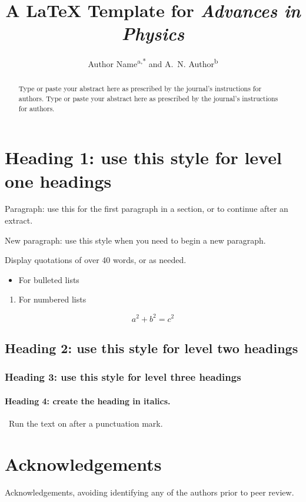 \documentclass{tandf}
\title{A \LaTeX{} Template for \textit{Advances in Physics}}
\author{Author Name\textsuperscript{a,*} and A.~N. Author\textsuperscript{b}}
\affiliation{\textsuperscript{a}Department, University, City, Country; \textsuperscript{b}Department, University, City, Country}
\begin{document}
\maketitle
\begin{abstract}
Type or paste your abstract here as prescribed by the journal's instructions for authors. Type or paste your abstract here as prescribed by the journal's instructions for authors.
\end{abstract}
\section{Heading 1: use this style for level one headings}
Paragraph: use this for the first paragraph in a section, or to continue after an extract.

New paragraph: use this style when you need to begin a new paragraph.

Display quotations of over 40 words, or as needed.
\begin{itemize}
  \item For bulleted lists
\end{itemize}
\begin{enumerate}
  \item For numbered lists
\end{enumerate}
\begin{equation}
  a^2 + b^2 = c^2
\end{equation}
\subsection{Heading 2: use this style for level two headings}
\subsubsection{Heading 3: use this style for level three headings}
\paragraph{Heading 4: create the heading in italics.}\ Run the text on after a punctuation mark.
\section{Acknowledgements}
Acknowledgements, avoiding identifying any of the authors prior to peer review.

\nocite{example2026}

\end{document}
